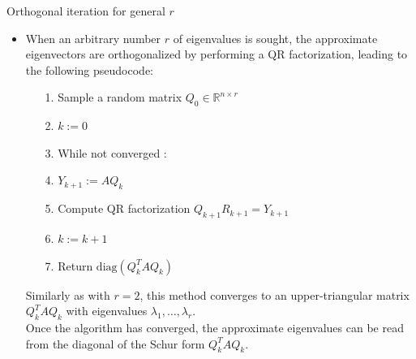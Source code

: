 \documentclass[t,usepdftitle=false]{beamer}
\begin{document}
\begin{frame}{Orthogonal iteration for general $r$}
\begin{itemize}
\item When an arbitrary number $r$ of eigenvalues is sought, the approximate eigenvectors are orthogonalized by performing a QR factorization, leading to the following pseudocode:\vspace{.2cm}
\begin{itemize}\normalsize
\item[1.] Sample a random matrix $Q_0\in\mathbb{R}^{n\times r}$\vspace{.07cm}
\item[2.] $k:=0$\vspace{.07cm}
\item[3.] While not converged :\vspace{.07cm}
\item[4.]\hspace{.4cm}$Y_{k+1}:=AQ_k$\vspace{.07cm}
\item[5.]\hspace{.4cm}Compute QR factorization $Q_{k+1}R_{k+1}=Y_{k+1}$\vspace{.07cm}
\item[6.]\hspace{.4cm}$k:=k+1$\vspace{.07cm}
\item[7.] Return $\mathrm{diag}(Q_k^TAQ_k)$\vspace{.2cm}
\end{itemize}
Similarly as with $r=2$, this method converges to an upper-triangular matrix $Q_k^TAQ_k$ with eigenvalues $\lambda_1,\dots,\lambda_r$.\vspace{.1cm}\\
Once the algorithm has converged, the approximate eigenvalues can be read from the diagonal of the Schur form  $Q_k^TAQ_k$.
\end{itemize}
\end{frame}
\end{document}
